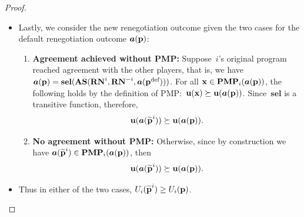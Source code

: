 \documentclass[sigconf]{aamas}
\newcommand{\selection}{sel}%
\newcommand{\renegb}{\mathbf{\selection}}
\theoremstyle{definition}
\begin{document}
\begin{proof}
\begin{itemize}
\begin{itemize}
           \item Lastly, we consider the new
            renegotiation outcome
            given the two cases for 
            the default
            renegotiation outcome
            $\boldsymbol{a}(\textbf{p})$:
            \begin{enumerate}
                 \item \textbf{Agreement
                 achieved without PMP:} Suppose~$i$'s original program
                 reached agreement
                 with the other players,
                 that is, we have $\fullact(\fullprog) = \renegb(\intsect(\renegi, \renegmi, \fullact(\deffullprog)))$.
                For all $\textbf{x} \in \mathbf{PMP}_i(\boldsymbol{a}(\textbf{p}))$, the following holds by the
                definition
                of PMP:\ $\textbf{u}(\textbf{x}) \succeq \textbf{u}(\boldsymbol{a}(\textbf{p}))$.
                Since~$\renegb$ is a transitive
                \selfunction{} function,
                therefore,
                $$\textbf{u}(\boldsymbol{a}({\widetilde{\textbf{p}}^i})) \succeq 
                \textbf{u}(\boldsymbol{a}(\textbf{p})).
                $$
                \item \textbf{No agreement without PMP:} Otherwise, since by construction we have $\boldsymbol{a}({\widetilde{\textbf{p}}^i}) \in \mathbf{PMP}_i(\boldsymbol{a}(\textbf{p}))$,
                then
                $$
                \textbf{u}(\boldsymbol{a}({\widetilde{\textbf{p}}^i})) \succeq 
                \textbf{u}(\boldsymbol{a}(\textbf{p})).
                $$
            \end{enumerate}
            \item Thus in either
            of the two cases,
            $U_i({\widetilde{\textbf{p}}^i}) \geq U_i(\textbf{p})$.
        \end{itemize}
    \end{itemize}


\end{proof}
\end{document}
